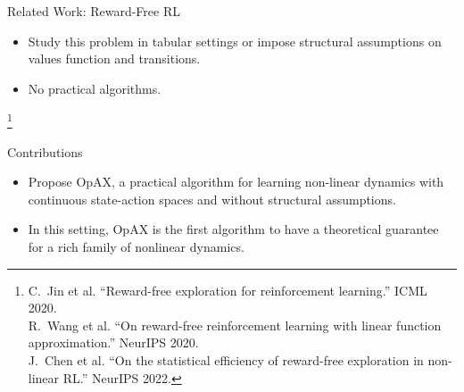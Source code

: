 \documentclass[11pt,aspectratio=169]{beamer}
\newcommand\reffootnote[1]{%
\begingroup
\renewcommand\thefootnote{}\footnote{\hspace{-20px}\color{DarkGray}#1\vspace{5px}}%
\addtocounter{footnote}{-1}%
\endgroup
}
\begin{document}
\begin{frame}{Related Work: Reward-Free RL}

    \begin{itemize}
        \item Study this problem in tabular settings or impose \textcolor{ETHRed}{structural assumptions on values function and transitions}.
        \item No practical algorithms.
    \end{itemize}

    \reffootnote{C.~Jin et al. ``Reward-free exploration for reinforcement learning.'' ICML 2020.\\
    R.~Wang et al. ``On reward-free reinforcement learning with linear function approximation.'' NeurIPS 2020.\\
    J.~Chen et al. ``On the statistical efficiency of reward-free exploration in non-linear RL.'' NeurIPS 2022.}
\end{frame}


\begin{frame}{Contributions}

    \begin{itemize}
        \item Propose OpAX, a practical algorithm for learning non-linear dynamics with \textcolor{ETHRed}{continuous} state-action spaces and \textcolor{ETHRed}{without} structural assumptions.
        \item In this setting, OpAX is the \textcolor{ETHRed}{first} algorithm to have a theoretical guarantee for a rich family of nonlinear dynamics. 
    \end{itemize}
\end{frame}
\end{document}
